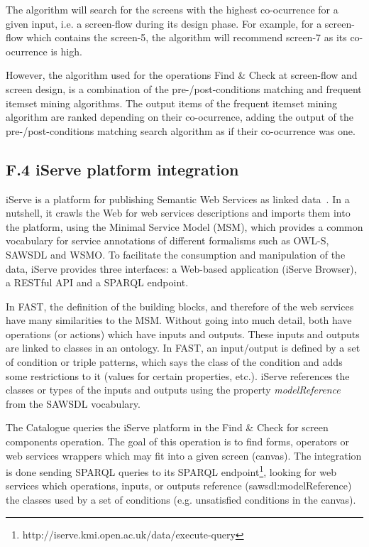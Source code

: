 \documentclass{fast_latex}
\begin{document}
The algorithm will search for the screens with the highest co-ocurrence for a given input, i.e. a screen-flow during its design phase. For example, for a screen-flow which contains the screen-5, the algorithm will recommend screen-7 as its co-ocurrence is high.

However, the algorithm used for the operations Find \& Check at screen-flow and screen design, is a combination of the pre-/post-conditions matching and frequent itemset mining algorithms. The output items of the frequent itemset mining algorithm are ranked depending on their co-ocurrence, adding the output of the pre-/post-conditions matching search algorithm as if their co-ocurrence was one.


\subsection*{F.4 iServe platform integration}

iServe is a platform for publishing Semantic Web Services as linked data~\cite{oro23093}. In a nutshell, it crawls the Web for web services descriptions and imports them into the platform, using the Minimal Service Model (MSM), which provides a common vocabulary for service annotations of different formalisms such as OWL-S, SAWSDL and WSMO. To facilitate the consumption and manipulation of the data, iServe provides three interfaces: a Web-based application (iServe Browser), a RESTful API and a SPARQL endpoint.

In FAST, the definition of the building blocks, and therefore of the web services have many similarities to the MSM. Without going into much detail, both have operations (or actions) which have inputs and outputs. These inputs and outputs are linked to classes in an ontology. In FAST, an input/output is defined by a set of condition or triple patterns, which says the class of the condition and adds some restrictions to it (values for certain properties, etc.). iServe references the classes or types of the inputs and outputs using the property \emph{modelReference} from the SAWSDL vocabulary.

The Catalogue queries the iServe platform in the Find \& Check for screen components operation. The goal of this operation is to find forms, operators or web services wrappers which may fit into a given screen (canvas). The integration is done sending SPARQL queries to its SPARQL endpoint\footnote{http://iserve.kmi.open.ac.uk/data/execute-query}, looking for web services which operations, inputs, or outputs reference (sawsdl:modelReference) the classes used by a set of conditions (e.g. unsatisfied conditions in the canvas).
\end{document}
